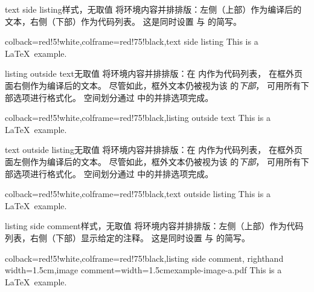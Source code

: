 \begin{docTcbKey}{text side listing}{}{样式，无取值}
将环境内容并排排版：左侧（上部）作为编译后的文本，右侧（下部）作为代码列表。
这是同时设置  与  的简写。
\begin{dispExample}
\begin{tcblisting}{colback=red!5!white,colframe=red!75!black,text side listing}
This is a \LaTeX\ example.
\end{tcblisting}
\end{dispExample}
\end{docTcbKey}


\begin{docTcbKey}{listing outside text}{}{无取值}
将环境内容并排排版：在  内作为代码列表，
在框外页面右侧作为编译后的文本。
尽管如此，框外文本仍被视为该  的\emph{下部}，
可用所有下部选项进行格式化。
空间划分通过  中的并排选项完成。
\begin{dispExample}
\begin{tcblisting}{colback=red!5!white,colframe=red!75!black,listing outside text}
This is a \LaTeX\ example.
\end{tcblisting}
\end{dispExample}
\end{docTcbKey}

\clearpage

\begin{docTcbKey}{text outside listing}{}{无取值}
将环境内容并排排版：在  内作为代码列表，
在框外页面左侧作为编译后的文本。
尽管如此，框外文本仍被视为该  的\emph{下部}，
可用所有下部选项进行格式化。
空间划分通过  中的并排选项完成。
\begin{dispExample}
\begin{tcblisting}{colback=red!5!white,colframe=red!75!black,text outside listing}
This is a \LaTeX\ example.
\end{tcblisting}
\end{dispExample}
\end{docTcbKey}



\begin{docTcbKey}{listing side comment}{}{样式，无取值}
将环境内容并排排版：左侧（上部）作为代码列表，右侧（下部）显示给定的注释。
这是同时设置  与  的简写。
\begin{dispExample}
\begin{tcblisting}{colback=red!5!white,colframe=red!75!black,listing side comment,
  righthand width=1.5cm,image comment={width=1.5cm}{example-image-a.pdf}}
This is a \LaTeX\ example.
\end{tcblisting}
\end{dispExample}
\end{docTcbKey}


